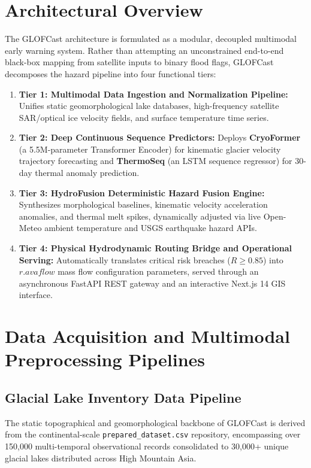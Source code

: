 \documentclass{mnnit}
\begin{document}
\section{Architectural Overview}
The GLOFCast architecture is formulated as a modular, decoupled multimodal early warning system. Rather than attempting an unconstrained end-to-end black-box mapping from satellite inputs to binary flood flags, GLOFCast decomposes the hazard pipeline into four functional tiers:
\begin{enumerate}
    \item \textbf{Tier 1: Multimodal Data Ingestion and Normalization Pipeline:} Unifies static geomorphological lake databases, high-frequency satellite SAR/optical ice velocity fields, and surface temperature time series.
    \item \textbf{Tier 2: Deep Continuous Sequence Predictors:} Deploys \textbf{CryoFormer} (a 5.5M-parameter Transformer Encoder) for kinematic glacier velocity trajectory forecasting and \textbf{ThermoSeq} (an LSTM sequence regressor) for 30-day thermal anomaly prediction.
    \item \textbf{Tier 3: HydroFusion Deterministic Hazard Fusion Engine:} Synthesizes morphological baselines, kinematic velocity acceleration anomalies, and thermal melt spikes, dynamically adjusted via live Open-Meteo ambient temperature and USGS earthquake hazard APIs.
    \item \textbf{Tier 4: Physical Hydrodynamic Routing Bridge and Operational Serving:} Automatically translates critical risk breaches ($R \ge 0.85$) into $r.avaflow$ mass flow configuration parameters, served through an asynchronous FastAPI REST gateway and an interactive Next.js 14 GIS interface.
\end{enumerate}

\section{Data Acquisition and Multimodal Preprocessing Pipelines}

\subsection{Glacial Lake Inventory Data Pipeline}
The static topographical and geomorphological backbone of GLOFCast is derived from the continental-scale \texttt{prepared\_dataset.csv} repository, encompassing over 150,000 multi-temporal observational records consolidated to 30,000+ unique glacial lakes distributed across High Mountain Asia. 
\end{document}
